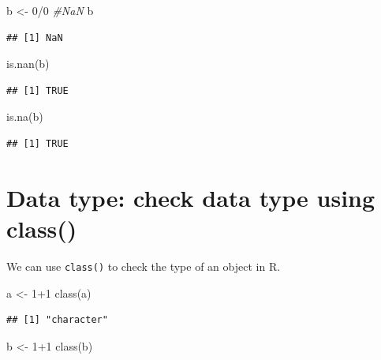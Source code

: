 \documentclass[
  11pt,
]{book}
\newenvironment{Shaded}{\begin{snugshade}}{\end{snugshade}}
\newcommand{\CommentTok}[1]{\textcolor[rgb]{0.56,0.35,0.01}{\textit{#1}}}
\newcommand{\DecValTok}[1]{\textcolor[rgb]{0.00,0.00,0.81}{#1}}
\newcommand{\FunctionTok}[1]{\textcolor[rgb]{0.00,0.00,0.00}{#1}}
\newcommand{\NormalTok}[1]{#1}
\newcommand{\OtherTok}[1]{\textcolor[rgb]{0.56,0.35,0.01}{#1}}
\newcommand{\SpecialCharTok}[1]{\textcolor[rgb]{0.00,0.00,0.00}{#1}}
\newcommand{\StringTok}[1]{\textcolor[rgb]{0.31,0.60,0.02}{#1}}
\begin{document}
\begin{Shaded}
\begin{Highlighting}[]
\NormalTok{b }\OtherTok{\textless{}{-}} \DecValTok{0}\SpecialCharTok{/}\DecValTok{0} \CommentTok{\#NaN}
\NormalTok{b}
\end{Highlighting}
\end{Shaded}

\begin{verbatim}
## [1] NaN
\end{verbatim}

\begin{Shaded}
\begin{Highlighting}[]
\FunctionTok{is.nan}\NormalTok{(b)}
\end{Highlighting}
\end{Shaded}

\begin{verbatim}
## [1] TRUE
\end{verbatim}

\begin{Shaded}
\begin{Highlighting}[]
\FunctionTok{is.na}\NormalTok{(b)}
\end{Highlighting}
\end{Shaded}

\begin{verbatim}
## [1] TRUE
\end{verbatim}

\hypertarget{data-type-check-data-type-using-class}{%
\section{Data type: check data type using class()}\label{data-type-check-data-type-using-class}}

We can use \texttt{class()} to check the type of an object in R.

\begin{Shaded}
\begin{Highlighting}[]
\NormalTok{a }\OtherTok{\textless{}{-}} \StringTok{\textquotesingle{}1+1\textquotesingle{}}
\FunctionTok{class}\NormalTok{(a)}
\end{Highlighting}
\end{Shaded}

\begin{verbatim}
## [1] "character"
\end{verbatim}

\begin{Shaded}
\begin{Highlighting}[]
\NormalTok{b }\OtherTok{\textless{}{-}} \DecValTok{1}\SpecialCharTok{+}\DecValTok{1}
\FunctionTok{class}\NormalTok{(b)}
\end{Highlighting}
\end{Shaded}
\end{document}
